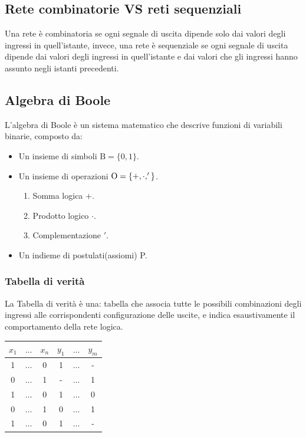 \documentclass{article}
\begin{document}
\subsection{Rete combinatorie VS reti sequenziali}
Una rete è combinatoria se ogni segnale di uscita dipende solo dai valori degli ingressi in quell’istante, invece, una rete è sequenziale se ogni segnale di uscita dipende dai valori degli ingressi in quell’istante e dai valori che gli ingressi hanno assunto negli istanti precedenti.

\subsection{Algebra di Boole}
L’algebra di Boole è un sistema matematico che descrive funzioni di variabili binarie, composto da: 
\begin{itemize}
    \item Un insieme di simboli $\text{B}=\{0,1\}$.
    \item Un insieme di operazioni $\text{O}=\{+,\space\cdot,\space'\}$.
          \begin{enumerate}
              \item Somma logica $+$.
              \item Prodotto logico $\cdot$.
              \item Complementazione $'$.
          \end{enumerate}
    \item Un indieme di postulati(assiomi) P.
\end{itemize}

\subsubsection{Tabella di verità}
La Tabella di verità è una: tabella che associa tutte le possibili combinazioni degli ingressi alle corrispondenti configurazione delle uscite, e indica esaustivamente il comportamento della rete logica.

\begin{center}
\begin{tabular}{|c c c | c c c|} 
 \hline
 $x_1$ & $\dots$ & $x_n$ & $y_1$ & $\dots$ & $y_m$ \\
 \hline
 1 & $\dots$ & 0 & 1 & $\dots$ & - \\ 
 \hline
 0 & $\dots$ & 1 & - & $\dots$ & 1 \\
 \hline
 1 & $\dots$ & 0 & 1 & $\dots$ & 0 \\
 \hline
 0 & $\dots$ & 1 & 0 & $\dots$ & 1 \\
 \hline
 1 & $\dots$ & 0 & 1 & $\dots$ & - \\
 \hline
\end{tabular}
\end{center}
\end{document}
